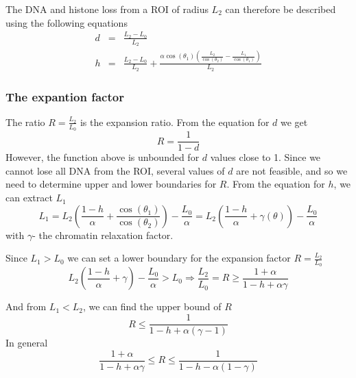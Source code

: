 \documentclass[12pt]{report}
\begin{document}
The DNA and histone loss from a ROI of radius $L_2$ can therefore be described using the following equations 
\begin{eqnarray}
 d &=& \frac{L_2-L_0}{L_2}\\
 h &=& \frac{L_2-L_0}{L_2}+\frac{\alpha \cos(\theta_1)\left(\frac{L_2}{\cos(\theta_2)} -\frac{L_1}{\cos(\theta_1)}\right)}{L_2}
\end{eqnarray}

\subsubsection{The expantion factor}
The ratio $R=\frac{L_2}{L_0}$ is the expansion ratio. From the equation for $d$ we get 
\begin{equation}
R=\frac{1}{1-d}
\end{equation}
 However, the function above is unbounded for $d$ values close to 1. Since we cannot lose all DNA from the ROI, several values of $d$ are not feasible, and so we need to determine upper and lower boundaries for $R$. From the equation for $h$, we can extract $L_1$ 
 \begin{equation}
 L_1 = L_2\left( \frac{1-h}{\alpha} +\frac{\cos(\theta_1)}{\cos(\theta_2)}\right)-\frac{L_0}{\alpha}=L_2\left(\frac{1-h}{\alpha}+\gamma(\theta) \right)-\frac{L_0}{\alpha}
 \end{equation}
 with $\gamma$- the chromatin relaxation factor. 
 
 Since $L_1>L_0$ we can set a lower boundary for the expansion factor $R=\frac{L_2}{L_0}$
 \begin{equation*}
 L_2\left(\frac{1-h}{\alpha}+\gamma\right)-\frac{L_0}{\alpha}>L_0 \Rightarrow \frac{L_2}{L_0}=R\geq \frac{1+\alpha}{1-h+\alpha\gamma}
 \end{equation*} 
 
 And from $L_1<L_2$, we can find the upper bound of $R$
 \begin{equation*}
 R \leq \frac{1}{1-h+\alpha(\gamma -1)}
 \end{equation*}
  In general 
  \begin{equation}\label{eq:expansionFactorRange}
  \frac{1+\alpha}{1-h+\alpha \gamma}\leq R \leq \frac{1}{1-h-\alpha(1-\gamma)}
  \end{equation}
\end{document}
